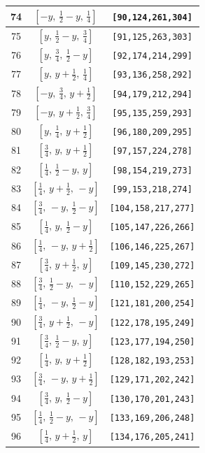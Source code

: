 \documentclass[fleqn,8pt]{jsarticle}
\begin{document}
\begin{longtable}{ccc}
74 & $\left[ - y,\, \frac{1}{2} - y,\, \frac{1}{4} \right]$ & {\tt [90,124,261,304]} \\ \hline
75 & $\left[ y,\, \frac{1}{2} - y,\, \frac{3}{4} \right]$ & {\tt [91,125,263,303]} \\ \hline
76 & $\left[ y,\, \frac{3}{4},\, \frac{1}{2} - y \right]$ & {\tt [92,174,214,299]} \\ \hline
77 & $\left[ y,\, y + \frac{1}{2},\, \frac{1}{4} \right]$ & {\tt [93,136,258,292]} \\ \hline
78 & $\left[ - y,\, \frac{3}{4},\, y + \frac{1}{2} \right]$ & {\tt [94,179,212,294]} \\ \hline
79 & $\left[ - y,\, y + \frac{1}{2},\, \frac{3}{4} \right]$ & {\tt [95,135,259,293]} \\ \hline
80 & $\left[ y,\, \frac{1}{4},\, y + \frac{1}{2} \right]$ & {\tt [96,180,209,295]} \\ \hline
81 & $\left[ \frac{3}{4},\, y,\, y + \frac{1}{2} \right]$ & {\tt [97,157,224,278]} \\ \hline
82 & $\left[ \frac{1}{4},\, \frac{1}{2} - y,\, y \right]$ & {\tt [98,154,219,273]} \\ \hline
83 & $\left[ \frac{1}{4},\, y + \frac{1}{2},\, - y \right]$ & {\tt [99,153,218,274]} \\ \hline
84 & $\left[ \frac{3}{4},\, - y,\, \frac{1}{2} - y \right]$ & {\tt [104,158,217,277]} \\ \hline
85 & $\left[ \frac{1}{4},\, y,\, \frac{1}{2} - y \right]$ & {\tt [105,147,226,266]} \\ \hline
86 & $\left[ \frac{1}{4},\, - y,\, y + \frac{1}{2} \right]$ & {\tt [106,146,225,267]} \\ \hline
87 & $\left[ \frac{3}{4},\, y + \frac{1}{2},\, y \right]$ & {\tt [109,145,230,272]} \\ \hline
88 & $\left[ \frac{3}{4},\, \frac{1}{2} - y,\, - y \right]$ & {\tt [110,152,229,265]} \\ \hline
89 & $\left[ \frac{1}{4},\, - y,\, \frac{1}{2} - y \right]$ & {\tt [121,181,200,254]} \\ \hline
90 & $\left[ \frac{3}{4},\, y + \frac{1}{2},\, - y \right]$ & {\tt [122,178,195,249]} \\ \hline
91 & $\left[ \frac{3}{4},\, \frac{1}{2} - y,\, y \right]$ & {\tt [123,177,194,250]} \\ \hline
92 & $\left[ \frac{1}{4},\, y,\, y + \frac{1}{2} \right]$ & {\tt [128,182,193,253]} \\ \hline
93 & $\left[ \frac{3}{4},\, - y,\, y + \frac{1}{2} \right]$ & {\tt [129,171,202,242]} \\ \hline
94 & $\left[ \frac{3}{4},\, y,\, \frac{1}{2} - y \right]$ & {\tt [130,170,201,243]} \\ \hline
95 & $\left[ \frac{1}{4},\, \frac{1}{2} - y,\, - y \right]$ & {\tt [133,169,206,248]} \\ \hline
96 & $\left[ \frac{1}{4},\, y + \frac{1}{2},\, y \right]$ & {\tt [134,176,205,241]} \\
\end{longtable}
\end{document}
